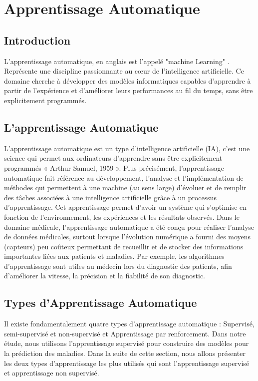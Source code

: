 \chapter{Apprentissage Automatique}

\section{Introduction}
L'apprentissage automatique, en anglais est l'appelé "machine Learning" .
Représente une discipline passionnante au cœur de l'intelligence artificielle. 
Ce domaine cherche à développer des modèles informatiques capables d'apprendre à partir de l'expérience et d'améliorer leurs performances au fil du temps, sans être explicitement programmés.
 

\section{L'apprentissage Automatique }
L’apprentissage automatique est un type d'intelligence artificielle (IA), c’est une science qui permet aux ordinateurs d'apprendre sans être explicitement programmés « Arthur Samuel, 1959 ». Plus précisément, l'apprentissage automatique fait référence au développement, l'analyse et l'implémentation de méthodes qui permettent à une machine (au sens large) d'évoluer et de remplir des tâches associées à une intelligence artificielle grâce à un processus d'apprentissage. Cet apprentissage permet d'avoir un système qui s'optimise en fonction de l'environnement, les expériences et les résultats observés.
Dans le domaine médicale, l’apprentissage automatique a été conçu pour réaliser l'analyse de données médicales, surtout lorsque l'évolution numérique a fourni des moyens (capteurs) peu coûteux permettant de recueillir et de stocker des informations importantes liées aux patients et maladies. Par exemple, les algorithmes d'apprentissage sont utiles au médecin lors du diagnostic des patients, afin d'améliorer la vitesse, la précision et la fiabilité de son diagnostic.

\section{Types d’Apprentissage Automatique }
Il existe fondamentalement quatre types d’apprentissage automatique : Supervisé, semi-supervisé et non-supervisé et Apprentissage par renforcement. 
Dans notre étude, nous utilisons l’apprentissage supervisé pour construire des modèles pour la prédiction des maladies.
Dans la suite de cette section, nous allons présenter les deux types d’apprentissage les plus utilisés qui sont l’apprentissage supervisé et apprentissage non supervisé.

